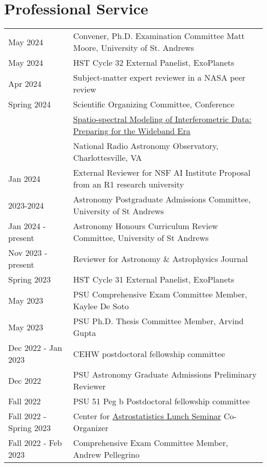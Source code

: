 \section*{Professional Service}
\begin{tabular*}{\textwidth}{@{\hspace{10pt}}p{1.4in}l}
May 2024 & Convener, Ph.D. Examination Committee Matt Moore, University of St. Andrews\\
May 2024 & HST Cycle 32 External Panelist, ExoPlanets \\    
Apr 2024 & Subject-matter expert reviewer in a NASA peer review \\
Spring 2024 & Scientific Organizing Committee, Conference\\
& \href{https://science.nrao.edu/facilities/alma/naasc-workshops/ssmid/index}{Spatio-spectral Modeling of Interferometric Data: Preparing for the Wideband Era} \\
& National Radio Astronomy Observatory, Charlottesville, VA \\
Jan 2024 & External Reviewer for NSF AI Institute Proposal from an R1 research university \\
2023-2024 & Astronomy Postgraduate Admissions Committee, University of St Andrews \\
Jan 2024 - present & Astronomy Honours Curriculum Review Committee, University of St Andrews \\
Nov 2023 - present & Reviewer for Astronomy \& Astrophysics Journal \\
Spring 2023 & HST Cycle 31 External Panelist, ExoPlanets \\
May 2023 & PSU Comprehensive Exam Committee Member, Kaylee De Soto \\    
May 2023 & PSU Ph.D. Thesis Committee Member, Arvind Gupta\\
Dec 2022 - Jan 2023 & CEHW postdoctoral fellowship committee \\
Dec 2022 & PSU Astronomy Graduate Admissions Preliminary Reviewer \\
Fall 2022 & PSU 51 Peg b Postdoctoral fellowship committee \\
Fall 2022 - Spring 2023 & Center for \href{https://sites.psu.edu/astrostatistics/cast-lunch-meetings/}{Astrostatistics Lunch Seminar} Co-Organizer \\
Fall 2022 - Feb 2023 & Comprehensive Exam Committee Member, Andrew Pellegrino \\    

\end{tabular*}

